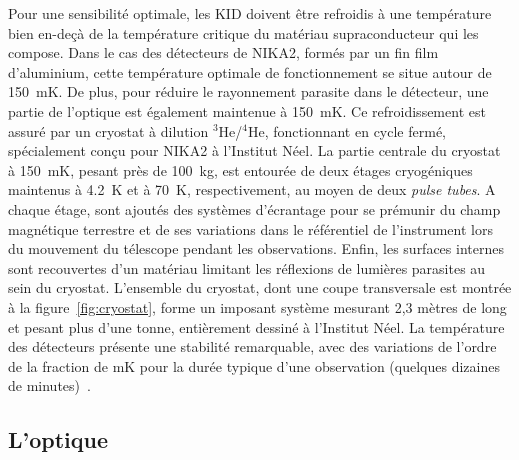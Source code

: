 Pour une sensibilité optimale, les KID doivent être refroidis à une
température bien en-deçà de la température critique du matériau
supraconducteur qui les compose. Dans le cas des détecteurs de NIKA2,
formés par un fin film d'aluminium, cette température optimale de
fonctionnement se situe autour de 150~mK. De plus, pour réduire le
rayonnement parasite dans le détecteur, une partie de l'optique est
également maintenue à 150~mK. Ce refroidissement est assuré par
un cryostat à dilution $^3$He/$^4$He, fonctionnant en cycle
fermé, spécialement conçu pour NIKA2 à l'Institut Néel. La partie
centrale du cryostat à 150~mK, pesant près de 100~kg, est entourée de
deux étages cryogéniques maintenus à 4.2~K et à 70~K, respectivement, au
moyen de deux \emph{pulse tubes}. A chaque étage, sont ajoutés des
systèmes d'écrantage pour se prémunir du champ magnétique terrestre et
de ses variations dans le référentiel de l'instrument lors du
mouvement du télescope pendant les observations. Enfin, les surfaces
internes sont recouvertes d'un matériau limitant les réflexions de
lumières parasites au sein du cryostat. L'ensemble du cryostat, dont
une coupe transversale est montrée à la figure~\ref{fig:cryostat}, forme
un imposant système mesurant 2,3 mètres de long et pesant plus d'une
tonne, entièrement dessiné à l'Institut Néel. La température des
détecteurs présente une stabilité remarquable, avec des variations de
l'ordre de la fraction de mK pour la durée typique d'une observation
(quelques dizaines de minutes)~\citep{Adam2018}.

\subsection{L'optique}
\label{se:optics}

